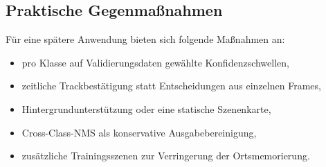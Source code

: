 \subsection{Praktische Gegenmaßnahmen}

Für eine spätere Anwendung bieten sich folgende Maßnahmen an:

\begin{itemize}
    \item pro Klasse auf Validierungsdaten gewählte Konfidenzschwellen,
    \item zeitliche Trackbestätigung statt Entscheidungen aus einzelnen Frames,
    \item Hintergrundunterstützung oder eine statische Szenenkarte,
    \item Cross-Class-NMS als konservative Ausgabebereinigung,
    \item zusätzliche Trainingsszenen zur Verringerung der Ortsmemorierung.
\end{itemize}
